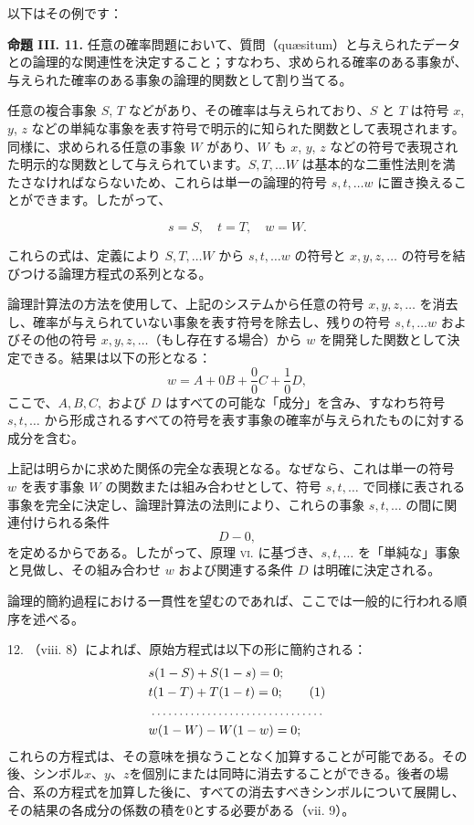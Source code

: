 \documentclass[a4paper,11pt,openany]{ltjsbook}
\begin{document}
以下はその例です：

\textbf{命題 III. 11.} 任意の確率問題において、質問（qu\ae{}situm）と与えられたデータとの論理的な関連性を決定すること；すなわち、求められる確率のある事象が、与えられた確率のある事象の論理的関数として割り当てる。

任意の複合事象 $S$, $T$ などがあり、その確率は与えられており、$S$ と $T$ は符号 $x$, $y$, $z$ などの単純な事象を表す符号で明示的に知られた関数として表現されます。同様に、求められる任意の事象 $W$ があり、$W$ も $x$, $y$, $z$ などの符号で表現された明示的な関数として与えられています。$S, T,\dotsc W$ は基本的な二重性法則を満たさなければならないため、これらは単一の論理的符号 $s, t,\dotsc w$ に置き換えることができます。したがって、

\[
s = S, \quad t = T, \quad w = W.
\]

これらの式は、定義により \( S, T, \dotsc W \) から \( s, t, \dotsc w \) の符号と \( x, y, z, \dotsc \) の符号を結びつける論理方程式の系列となる。

論理計算法の方法を使用して、上記のシステムから任意の符号 \( x, y, z, \dotsc \) を消去し、確率が与えられていない事象を表す符号を除去し、残りの符号 \( s, t, \dotsc w \) およびその他の符号 \( x, y, z, \dotsc \)（もし存在する場合）から \( w \) を開発した関数として決定できる。結果は以下の形となる：
\[
w = A + 0B + \frac{0}{0} C + \frac{1}{0} D,
\]
ここで、\( A, B, C, \) および \( D \) はすべての可能な「成分」を含み、すなわち符号 \( s, t, \dotsc \) から形成されるすべての符号を表す事象の確率が与えられたものに対する成分を含む。

上記は明らかに求めた関係の完全な表現となる。なぜなら、これは単一の符号 \( w \) を表す事象 \( W \) の関数または組み合わせとして、符号 \( s, t, \dotsc \) で同様に表される事象を完全に決定し、論理計算法の法則により、これらの事象 \( s, t, \dotsc \) の間に関連付けられる条件
\[
D - 0,
\]
を定めるからである。したがって、原理 \textsc{vi.} に基づき、\( s, t, \dotsc \) を「単純な」事象と見做し、その組み合わせ \( w \) および関連する条件 \( D \) は明確に決定される。

論理的簡約過程における一貫性を望むのであれば、ここでは一般的に行われる順序を述べる。

12. （viii. 8）によれば、原始方程式は以下の形に簡約される：
\begin{align*}
&s(1-S) + S(1-s) = 0;\\
&t(1-T)+ T(1-t) = 0;\tag{1}\\
\multispan2\dotfill\\
&w(1-W)-W(1-w) = 0;
\end{align*}
これらの方程式は、その意味を損なうことなく加算することが可能である。その後、シンボル$x$、$y$、$z$を個別にまたは同時に消去することができる。後者の場合、系の方程式を加算した後に、すべての消去すべきシンボルについて展開し、その結果の各成分の係数の積を0とする必要がある（vii. 9）。
\end{document}
